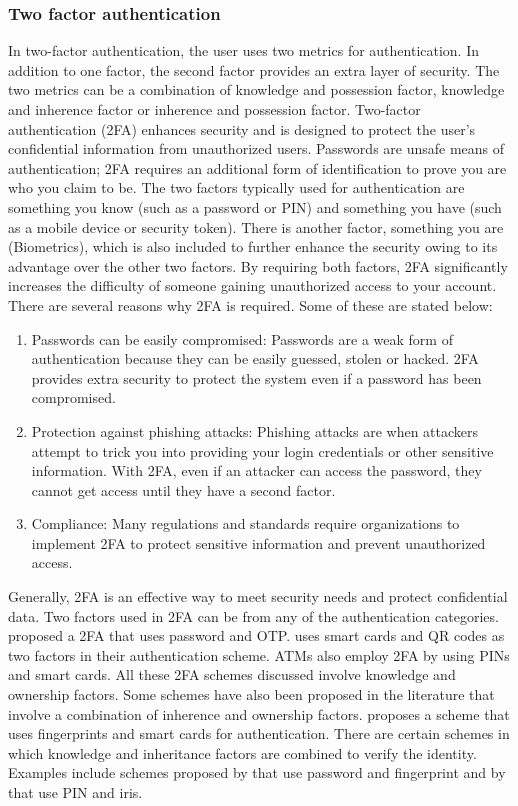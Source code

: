 \documentclass[10pt,journal,compsoc]{IEEEtran}
\begin{document}
      \subsubsection{Two factor authentication}
     In two-factor authentication, the user uses two metrics for authentication. In addition to one factor, the second factor provides an extra layer of security. The two metrics can be a combination of knowledge and possession factor, knowledge and inherence factor or inherence and possession factor. Two-factor authentication (2FA) enhances security and is designed to protect the user's confidential information from unauthorized users. Passwords are unsafe means of authentication; 2FA requires an additional form of identification to prove you are who you claim to be. The two factors typically used for authentication are something you know (such as a password or PIN) and something you have (such as a mobile device or security token). There is another factor, something you are (Biometrics), which is also included to further enhance the security owing to its advantage over the other two factors. By requiring both factors, 2FA significantly increases the difficulty of someone gaining unauthorized access to your account. There are several reasons why 2FA is required. Some of these are stated below:\\
     \begin{enumerate}
         \item Passwords can be easily compromised: Passwords are a weak form of authentication because they can be easily guessed, stolen or hacked. 2FA provides extra security to protect the system even if a password has been compromised.
         \item Protection against phishing attacks: Phishing attacks are when attackers attempt to trick you into providing your login credentials or other sensitive information. With 2FA, even if an attacker can access the password, they cannot get access until they have a second factor.
         \item Compliance: Many regulations and standards require organizations to implement 2FA to protect sensitive information and prevent unauthorized access.
      \end{enumerate}
      
Generally, 2FA is an effective way to meet security needs and protect confidential data. Two factors used in 2FA can be from any of the authentication categories. \cite{IEEEtran62} proposed a 2FA that uses password and OTP. \cite{IEEEtran22} uses smart cards and QR codes as two factors in their authentication scheme. ATMs also employ 2FA by using PINs and smart cards. All these 2FA schemes discussed involve knowledge and ownership factors. Some schemes have also been proposed in the literature that involve a combination of inherence and ownership factors. \cite{IEEEtran63} proposes a scheme that uses fingerprints and smart cards for authentication. There are certain schemes in which knowledge and inheritance factors are combined to verify the identity. Examples include schemes proposed by \cite{IEEEtran64} that use password and fingerprint and by \cite{IEEEtran65} that use PIN and iris.
\end{document}
